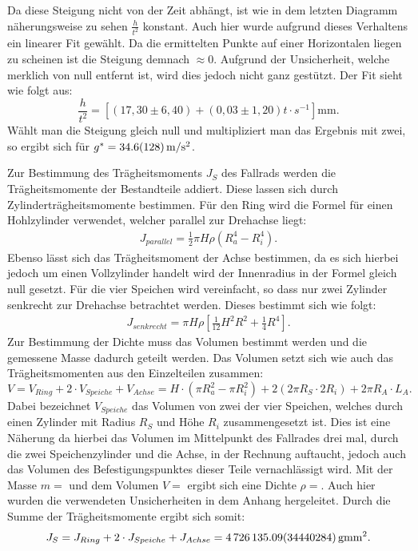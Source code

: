 			Da diese Steigung nicht von der Zeit abhängt, ist wie in dem letzten Diagramm näherungsweise zu sehen $\frac{h}{t^2}$ konstant. Auch hier wurde aufgrund dieses Verhaltens ein linearer Fit gewählt. Da die ermittelten Punkte auf einer Horizontalen liegen zu scheinen ist die Steigung demnach $\approx 0$. Aufgrund der Unsicherheit, welche merklich von null entfernt ist, wird dies jedoch nicht ganz gestützt. Der Fit sieht wie folgt aus:
			\begin{equation*}
				\frac{h}{t^2} = [(17,30 \pm 6,40) + (0,03 \pm 1,20)t\cdot\si{s^{-1}}]\si{\mm}.
			\end{equation*} 
			Wählt man die Steigung gleich null und multipliziert man das Ergebnis mit zwei, so ergibt sich für $g^{*} = \SI{34,6+-12,8}{\m\per\s^2}$. 
					
			Zur Bestimmung des Trägheitsmoments $J_S$ des Fallrads werden die Trägheitsmomente der Bestandteile addiert. Diese lassen sich durch Zylinderträgheitsmomente bestimmen. Für den Ring wird die Formel für einen Hohlzylinder verwendet, welcher parallel zur Drehachse liegt:
			\begin{align}
					J_{parallel} = \frac{1}{2}\pi H\rho(R_a^4-R_i^4). \label{eq:Trägpar}
			\end{align}
			Ebenso lässt sich das Trägheitsmoment der Achse bestimmen, da es sich hierbei jedoch um einen Vollzylinder handelt wird der Innenradius in der Formel gleich null gesetzt.
			Für die vier Speichen wird vereinfacht, so dass nur zwei Zylinder senkrecht zur Drehachse betrachtet werden.
			Dieses bestimmt sich wie folgt: 
			\begin{align}
				J_{senkrecht} = \pi H\rho\left[\frac{1}{12}H^2R^2+\frac{1}{4}R^4\right]. \label{eq:Trägsenk}
			\end{align} 
			Zur Bestimmung der Dichte muss das Volumen bestimmt werden und die gemessene Masse dadurch geteilt werden. Das Volumen setzt sich wie auch das Trägheitsmomenten aus den Einzelteilen zusammen:
			\begin{equation}
				V = V_{Ring} + 2\cdot V_{Speiche} + V_{Achse} = H\cdot(\pi R_a^2 - \pi R_i^2) + 2(2\pi R_S\cdot 2 R_i) + 2\pi R_A\cdot L_A.
			\end{equation}
			Dabei bezeichnet $V_{Speiche}$ das Volumen von zwei der vier Speichen, welches durch einen Zylinder mit Radius $R_S$ und Höhe $R_i$ zusammengesetzt ist. Dies ist eine Näherung da hierbei das Volumen im Mittelpunkt des Fallrades drei mal, durch die zwei Speichenzylinder und die Achse, in der Rechnung auftaucht, jedoch auch das Volumen des Befestigungspunktes dieser Teile vernachlässigt wird.
			Mit der Masse $m=$ und dem Volumen $V=$ ergibt sich eine Dichte $\rho = $. Auch hier wurden die verwendeten Unsicherheiten in dem Anhang hergeleitet.
			Durch die Summe der Trägheitsmomente ergibt sich somit:
			\begin{equation}
				J_S = J_{Ring} + 2\cdot J_{Speiche} + J_{Achse} = \SI{4726135,09+-344402,84}{\g\mm^2}.
			\end{equation}
			
